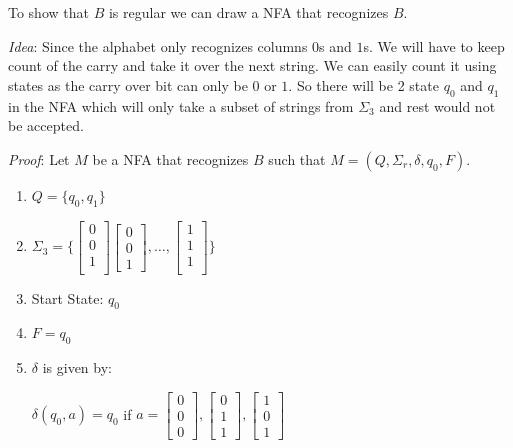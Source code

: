 \begin{solution}

  To show that $B$ is regular we can draw a NFA that recognizes $B$.

  \emph{Idea}: Since the alphabet only recognizes columns $0$s and $1$s. We will have to keep count of the carry and take it over the next string. We can easily count it using states as the carry over bit can only be $0$ or $1$. So there will be 2 state $q_{0}$ and $q_{1}$ in the NFA which will only take a subset of strings from $\Sigma_{3}$ and rest would not be accepted.

  \emph{Proof}:
  Let $M$ be a NFA that recognizes $B$ such that $M = (Q,\Sigma_{r}, \delta, q_{0}, F)$.
  \begin{enumerate}
    \item{} $Q = \{q_{0}, q_{1}\}$
    \item{} $\Sigma_{3} =\{
    \begin{bmatrix}
      0\\
      0\\
      1\\
    \end{bmatrix}
    \begin{bmatrix}
      0\\
      0\\
      1
    \end{bmatrix}
    , \ldots,
    \begin{bmatrix}
      1\\
      1\\
      1\\
    \end{bmatrix}\}$
    \item{} Start State: $q_{0}$
    \item{} $F = q_{0}$
    \item{} $\delta$ is given by:

    $\delta(q_{0}, a) = q_{0}$ if $a = \begin{bmatrix}
      0\\
      0\\
      0
    \end{bmatrix},
    \begin{bmatrix}
      0\\
      1\\
      1
    \end{bmatrix},
    \begin{bmatrix}
      1\\
      0\\
      1
    \end{bmatrix}$


\end{enumerate}
\end{solution}
